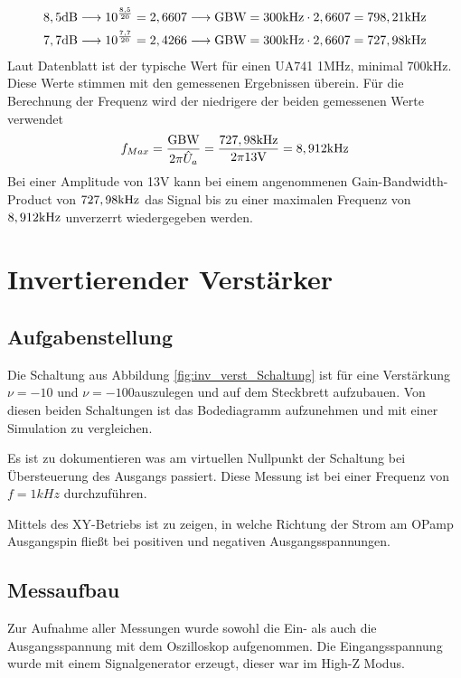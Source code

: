 \begin{align}
    8,5\text{dB} \longrightarrow 10^\frac{8,5}{20}=  2,6607\longrightarrow \text{GBW}=300\text{kHz}\cdot 2,6607=798,21\text{kHz} \\
    7,7\text{dB} \longrightarrow 10^\frac{7,7}{20}=  2,4266\longrightarrow \text{GBW}=300\text{kHz}\cdot 2,6607=727,98\text{kHz} 
\end{align}
Laut Datenblatt ist der typische Wert für einen UA741 1MHz, minimal 700kHz. Diese Werte stimmen mit den gemessenen Ergebnissen überein. Für die Berechnung der Frequenz wird der niedrigere der beiden gemessenen Werte verwendet
\begin{align}
    f_{Max}=\frac{\text{GBW}}{2\pi \hat{U}_a} =\frac{727,98\text{kHz}}{2\pi13\text{V}}=8,912\text{kHz}
\end{align}
Bei einer Amplitude von 13V kann bei einem angenommenen Gain-Bandwidth-Product von $727,98\text{kHz}$ das Signal bis zu einer maximalen Frequenz von $8,912\text{kHz}$ unverzerrt wiedergegeben werden.

\section{Invertierender Verstärker}
\subsection{Aufgabenstellung}
Die Schaltung aus Abbildung \ref{fig:inv_verst_Schaltung} ist für eine Verstärkung $\nu = -10$ und $\nu=-100$auszulegen und auf dem Steckbrett aufzubauen. Von diesen beiden Schaltungen ist das Bodediagramm aufzunehmen und mit einer Simulation zu vergleichen.

Es ist zu dokumentieren was am virtuellen Nullpunkt der Schaltung bei Übersteuerung des Ausgangs passiert. Diese Messung ist bei einer Frequenz von $f=1kHz$ durchzuführen. 

Mittels des XY-Betriebs ist zu zeigen, in welche Richtung der Strom am OPamp Ausgangspin fließt bei positiven und negativen Ausgangsspannungen. 


\subsection{Messaufbau}
Zur Aufnahme aller Messungen wurde sowohl die Ein- als auch die Ausgangsspannung mit dem Oszilloskop aufgenommen. Die Eingangsspannung wurde mit einem Signalgenerator erzeugt, dieser war im High-Z Modus. 


